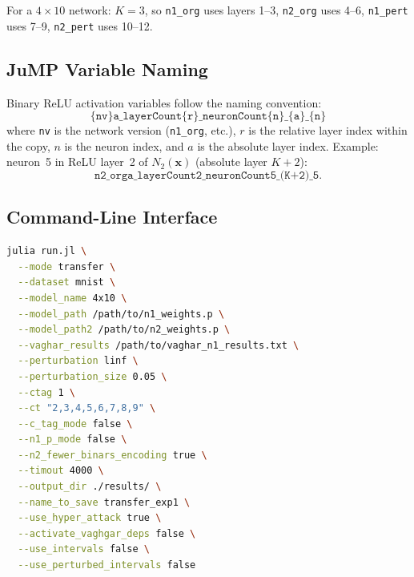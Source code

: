 \documentclass[11pt,a4paper]{article}
\theoremstyle{definition}
\theoremstyle{plain}
\newcommand{\NN}[1]{N_{#1}}
\newcommand{\vx}{\mathbf{x}}
\begin{document}
For a $4\times10$ network: $K=3$, so \texttt{n1\_org} uses layers 1--3, \texttt{n2\_org} uses 4--6, \texttt{n1\_pert} uses 7--9, \texttt{n2\_pert} uses 10--12.

\subsection{JuMP Variable Naming}

Binary ReLU activation variables follow the naming convention:
\[
  \texttt{\{nv\}a\_layerCount\{r\}\_neuronCount\{n\}\_\{a\}\_\{n\}}
\]
where \texttt{nv} is the network version (\texttt{n1\_org}, etc.), $r$ is the relative layer index within the copy, $n$ is the neuron index, and $a$ is the absolute layer index. Example: neuron~5 in ReLU layer~2 of $\NN{2}(\vx)$ (absolute layer $K+2$):
\[
  \texttt{n2\_orga\_layerCount2\_neuronCount5\_{(K+2)}\_5}.
\]

\subsection{Command-Line Interface}

\begin{lstlisting}[language=bash, basicstyle=\small\ttfamily, breaklines=true]
julia run.jl \
  --mode transfer \
  --dataset mnist \
  --model_name 4x10 \
  --model_path /path/to/n1_weights.p \
  --model_path2 /path/to/n2_weights.p \
  --vaghar_results /path/to/vaghar_n1_results.txt \
  --perturbation linf \
  --perturbation_size 0.05 \
  --ctag 1 \
  --ct "2,3,4,5,6,7,8,9" \
  --c_tag_mode false \
  --n1_p_mode false \
  --n2_fewer_binars_encoding true \
  --timout 4000 \
  --output_dir ./results/ \
  --name_to_save transfer_exp1 \
  --use_hyper_attack true \
  --activate_vaghgar_deps false \
  --use_intervals false \
  --use_perturbed_intervals false
\end{lstlisting}
\end{document}
